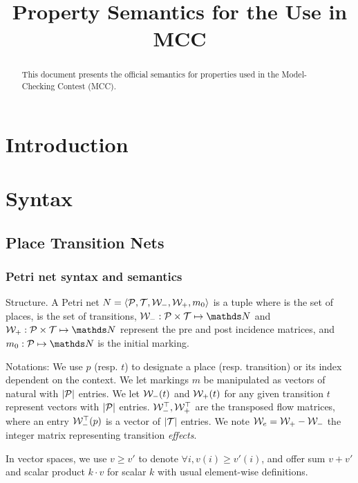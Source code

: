 \documentclass{llncs}
\title{Property Semantics for the Use in MCC}
\begin{document}
\maketitle


\begin{abstract}
This document presents the official semantics for properties used in the Model-Checking Contest (MCC).

\end{abstract}

\section{Introduction}


\section{Syntax}

\subsection{Place Transition Nets}


\subsubsection{Petri net syntax and semantics}

\begin{definition}
Structure. A Petri net $N=\langle \mathcal{P},\mathcal{T},\mathcal{W}_-,\mathcal{W}_+, m_0 \rangle$ is a tuple where \Places{} is the set of places, \Trans{} is the set of transitions, $\Pre: \Places \times \Trans \mapsto \nat$ and $\Post: \Places \times \Trans \mapsto \nat$ represent the pre and post incidence matrices, and $m_0: \Places \mapsto \nat$ is the initial marking.
\end{definition}

Notations: 
We use $p$ (resp. $t$) to designate a place (resp. transition) or its index dependent on the context. We let markings $m$ be manipulated as vectors of natural with $|\mathcal{P}|$ entries. We let $\mathcal{W}_-(t)$ and $\mathcal{W}_+(t)$ for any given transition $t$ represent vectors with $|\mathcal{P}|$ entries. $\mathcal{W}_-^\top, \mathcal{W}_+^\top$ are the transposed flow matrices, where an entry $\mathcal{W}_-^\top(p)$ is a vector of $|\mathcal{T}|$ entries. We note $\mathcal{W}_e = \mathcal{W}_+ - \mathcal{W}_-$ the integer matrix representing transition \textit{effects}. 

In vector spaces, we use $v \geq v'$ to denote $\forall i, v(i)\geq v'(i)$, and offer sum $v+v'$ and scalar product $k \cdot v$ for scalar $k$ with usual element-wise definitions.
\end{document}
